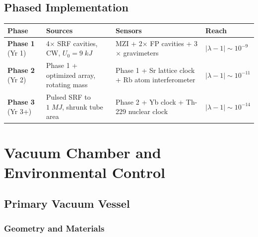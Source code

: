 \documentclass[11pt,a4paper]{article}
\begin{document}
\subsection{Phased Implementation}

\begin{longtable}{p{}p{}p{}p{}}
\toprule
\textbf{Phase} & \textbf{Sources} & \textbf{Sensors} & \textbf{Reach} \\
\midrule
\endhead
\textbf{Phase 1} (Yr 1) & 4$\times$ SRF cavities, CW, $U_0 = 9\;\si{kJ}$
& MZI + 2$\times$ FP cavities + 3$\times$ gravimeters
& $|\lambda{-}1| \sim 10^{-9}$ \\[6pt]
\textbf{Phase 2} (Yr 2) & Phase 1 + optimized array, rotating mass
& Phase 1 + Sr lattice clock + Rb atom interferometer
& $|\lambda{-}1| \sim 10^{-11}$ \\[6pt]
\textbf{Phase 3} (Yr 3+) & Pulsed SRF to $1\;\si{MJ}$, shrunk tube area
& Phase 2 + Yb clock + Th-229 nuclear clock
& $|\lambda{-}1| \sim 10^{-14}$ \\
\bottomrule
\end{longtable}

\section{Vacuum Chamber and Environmental Control}

\subsection{Primary Vacuum Vessel}

\subsubsection{Geometry and Materials}
\end{document}
